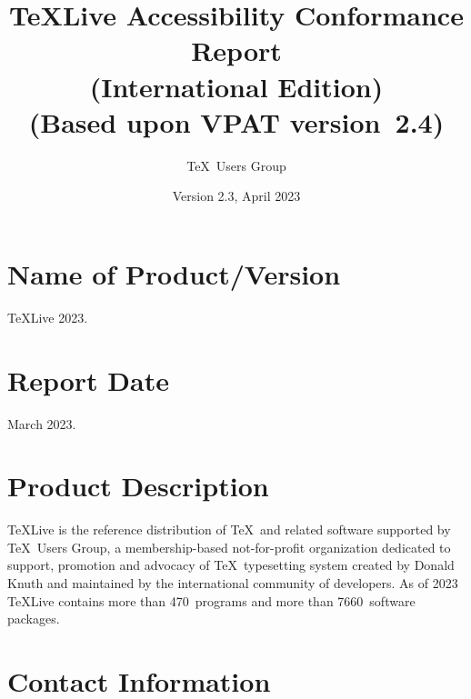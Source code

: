 \documentclass[titlepage]{article}
\begin{document}
\title{\TeX Live Accessibility Conformance Report\\
  (International Edition)\\
(Based upon VPAT\textsuperscript{\textregistered} version~2.4)}
\author{\TeX\ Users Group}
\date{Version 2.3, April 2023}

\hypersetup{
  pdftitle=TeX Live Accessibility Conformance Report,
  pdfauthor=TeX Users Group}
  
\maketitle

\newpage
{} 
\tableofcontents 

\newpage

\section{Name of Product/Version}
\label{sec:name}

\TeX Live 2023.


\section{Report Date}
\label{sec:date}

March 2023.


\section{Product Description}
\label{sec:description}

\TeX Live is the reference distribution of \TeX\ and related software
supported by \TeX\ Users Group, a membership-based not-for-profit
organization dedicated to support, promotion and advocacy of \TeX\
typesetting system created by Donald Knuth and maintained by the
international community of developers.  As of 2023 \TeX Live contains
more than 470~programs and more than 7660~software packages.

\section{Contact Information}
\label{sec:contact_info}
\end{document}
